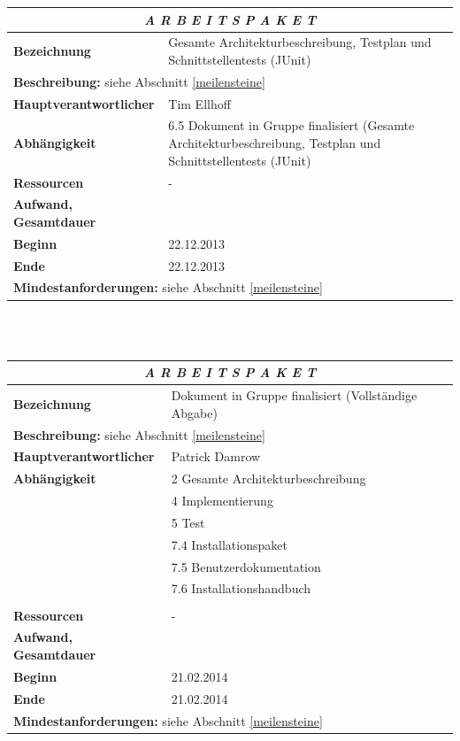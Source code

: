 \documentclass[fontsize=12pt,paper=a4,twoside]{scrartcl}
\begin{document}
\begin{tabular}{p{7.5cm}|p{7.5cm}}\toprule
\multicolumn{2}{c}{\textbf{\textit{A R B E I T S P A K E T \quad 6.6}}} \\ \toprule \hline
\textbf{Bezeichnung} & Gesamte Architekturbeschreibung, Testplan und Schnittstellentests (JUnit)\\\hline
\multicolumn{2}{p{15cm}}{\textbf{Beschreibung:} \newline 
siehe Abschnitt \ref{meilensteine} }  \\\hline
\textbf{Hauptverantwortlicher} & Tim Ellhoff \\\hline
\textbf{Abhängigkeit} & 6.5 Dokument in Gruppe finalisiert (Gesamte Architekturbeschreibung, Testplan und Schnittstellentests (JUnit)\\\hline
\textbf{Ressourcen} & -\\\hline
\textbf{Aufwand, Gesamtdauer} & \\\hline
\textbf{Beginn} & 22.12.2013 \\\hline
\textbf{Ende} & 22.12.2013\\\hline
\multicolumn{2}{p{15cm}}{\textbf{Mindestanforderungen: } \newline
siehe Abschnitt \ref{meilensteine}}  \\ \toprule
\end{tabular} \\\\

\begin{tabular}{p{7.5cm}|p{7.5cm}}\toprule
\multicolumn{2}{c}{\textbf{\textit{A R B E I T S P A K E T \quad 6.7}}} \\ \toprule \hline
\textbf{Bezeichnung} & Dokument in Gruppe finalisiert (Vollständige Abgabe)\\\hline
\multicolumn{2}{p{15cm}}{\textbf{Beschreibung:} \newline 
siehe Abschnitt \ref{meilensteine} }  \\\hline
\textbf{Hauptverantwortlicher} & Patrick Damrow \\\hline
\textbf{Abhängigkeit} & 2 Gesamte Architekturbeschreibung \\
& 4 Implementierung \\
& 5 Test \\
& 7.4 Installationspaket \\
& 7.5 Benutzerdokumentation \\
& 7.6 Installationshandbuch \\
\\\hline
\textbf{Ressourcen} & -\\\hline
\textbf{Aufwand, Gesamtdauer} & \\\hline
\textbf{Beginn} & 21.02.2014 \\\hline
\textbf{Ende} & 21.02.2014\\\hline
\multicolumn{2}{p{15cm}}{\textbf{Mindestanforderungen: } \newline
siehe Abschnitt \ref{meilensteine}}  \\ \toprule
\end{tabular} \\\\
\end{document}
